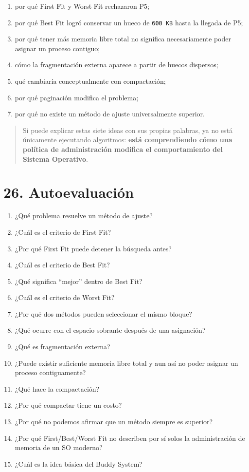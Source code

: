 \documentclass[
  spanish,
  letterpaper,
]{scrbook}
\providecommand{\tightlist}{%
  \setlength{\itemsep}{0pt}\setlength{\parskip}{0pt}}
\begin{document}
\begin{enumerate}
\def\labelenumi{\arabic{enumi}.}
\tightlist
\item
  por qué First Fit y Worst Fit rechazaron P5;
\item
  por qué Best Fit logró conservar un hueco de \texttt{600\ KB} hasta la
  llegada de P5;
\item
  por qué tener más memoria libre total no significa necesariamente
  poder asignar un proceso contiguo;
\item
  cómo la fragmentación externa aparece a partir de huecos dispersos;
\item
  qué cambiaría conceptualmente con compactación;
\item
  por qué paginación modifica el problema;
\item
  por qué no existe un método de ajuste universalmente superior.
\end{enumerate}

\begin{quote}
Si puede explicar estas siete ideas con sus propias palabras, ya no está
únicamente ejecutando algoritmos: \textbf{está comprendiendo cómo una
política de administración modifica el comportamiento del Sistema
Operativo}.
\end{quote}


\chapter{26. Autoevaluación}\label{autoevaluaciuxf3n-10}

\begin{enumerate}
\def\labelenumi{\arabic{enumi}.}
\tightlist
\item
  ¿Qué problema resuelve un método de ajuste?
\item
  ¿Cuál es el criterio de First Fit?
\item
  ¿Por qué First Fit puede detener la búsqueda antes?
\item
  ¿Cuál es el criterio de Best Fit?
\item
  ¿Qué significa ``mejor'' dentro de Best Fit?
\item
  ¿Cuál es el criterio de Worst Fit?
\item
  ¿Por qué dos métodos pueden seleccionar el mismo bloque?
\item
  ¿Qué ocurre con el espacio sobrante después de una asignación?
\item
  ¿Qué es fragmentación externa?
\item
  ¿Puede existir suficiente memoria libre total y aun así no poder
  asignar un proceso contiguamente?
\item
  ¿Qué hace la compactación?
\item
  ¿Por qué compactar tiene un costo?
\item
  ¿Por qué no podemos afirmar que un método siempre es superior?
\item
  ¿Por qué First/Best/Worst Fit no describen por sí solos la
  administración de memoria de un SO moderno?
\item
  ¿Cuál es la idea básica del Buddy System?
\end{enumerate}
\end{document}
